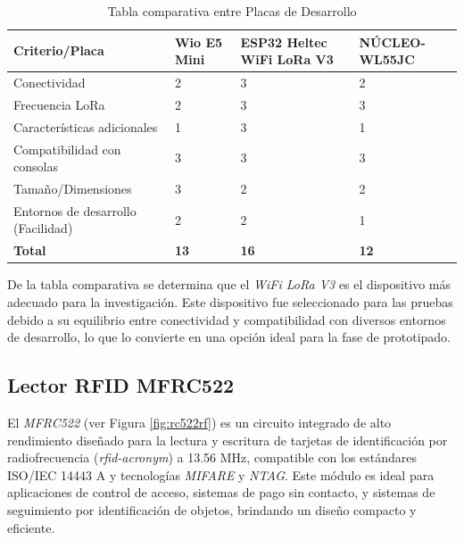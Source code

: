 \begin{table}[H]
\centering
\renewcommand{\arraystretch}{1.2} %
\caption{Tabla comparativa entre Placas de Desarrollo}
\label{fig:Elec_Mic}
\begin{tabular}{|p{4.5cm}|p{1.8cm}|p{3cm}|p{2.6cm}|}
\hline
\textbf{Criterio/Placa}        & \textbf{Wio E5 Mini} & \textbf{ESP32 Heltec WiFi LoRa V3} & \textbf{NÚCLEO-WL55JC} \\ \hline
Conectividad                  &                 2                    & 3                                  & 2                      \\ \hline
Frecuencia LoRa               & 2                    & 3                                  & 3                      \\ \hline
Características adicionales   & 1                    & 3                                  & 1                      \\ \hline
Compatibilidad con consolas   & 3                    & 3                                  & 3                      \\ \hline
Tamaño/Dimensiones            & 3                    & 2                                  & 2                      \\ \hline
Entornos de desarrollo (Facilidad) & 2              & 2                                  & 1                      \\ \hline
\textbf{Total}                & \textbf{13}          & \textbf{16}                        & \textbf{12}            \\ \hline
\end{tabular}
\end{table}


De la tabla comparativa se determina que el \textit{WiFi LoRa V3} es el dispositivo más adecuado para la investigación. Este dispositivo fue seleccionado para las pruebas debido a su equilibrio entre conectividad y compatibilidad con diversos entornos de desarrollo, lo que lo convierte en una opción ideal para la fase de prototipado.


\subsection{Lector RFID MFRC522}

El \textit{MFRC522} (ver Figura \ref{fig:rc522rf}) es un circuito integrado de alto rendimiento diseñado para la lectura y escritura de tarjetas de identificación por radiofrecuencia (\textit{\acrshort{rfid-acronym}}) a 13.56 MHz, compatible con los estándares ISO/IEC 14443 A y tecnologías \textit{MIFARE} y \textit{NTAG}. Este módulo es ideal para aplicaciones de control de acceso, sistemas de pago sin contacto, y sistemas de seguimiento por identificación de objetos, brindando un diseño compacto y eficiente.

